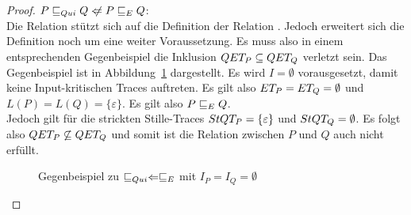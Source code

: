 \begin{proof}
  $P \QRel Q \hspace{0.1cm}\not\hspace{-0.1cm}\Leftarrow P \ERel Q$:\\
  Die Relation \QRel{} stützt sich auf die Definition der Relation \ERel{}.
  Jedoch erweitert sich die Definition noch um eine weiter Voraussetzung. Es
  muss also in einem entsprechenden Gegenbeispiel die Inklusion $QET _P
  \subseteq QET _Q$ verletzt sein. Das Gegenbeispiel ist in
  Abbildung~\ref{QuiEGegenBsp} dargestellt. Es wird $I = \emptyset$
  vorausgesetzt, damit keine Input-kritischen Traces auftreten. Es gilt also
  $ET _P = ET _Q = \emptyset$ und $L(P) = L(Q) = \{\varepsilon\}$. Es gilt
  also $P \sqsubseteq  _E Q$.\\
  Jedoch gilt für die strickten Stille-Traces $StQT _P = \{\varepsilon\}$ und
  $StQT _Q = \emptyset$. Es folgt also $QET _P \not\subseteq QET _Q$ und
  somit ist die Relation \QRel{} zwischen $P$ und $Q$ auch nicht erfüllt.

  \begin{figure}[htbp]
    \begin{center}
      \caption{Gegenbeispiel zu $ \sqsubseteq  _{Qui} \Leftarrow  \sqsubseteq  _E$ mit $I_P = I_Q =
      \emptyset$}
      \label{QuiEGegenBsp}
    \end{center}
  \end{figure}
\end{proof}
